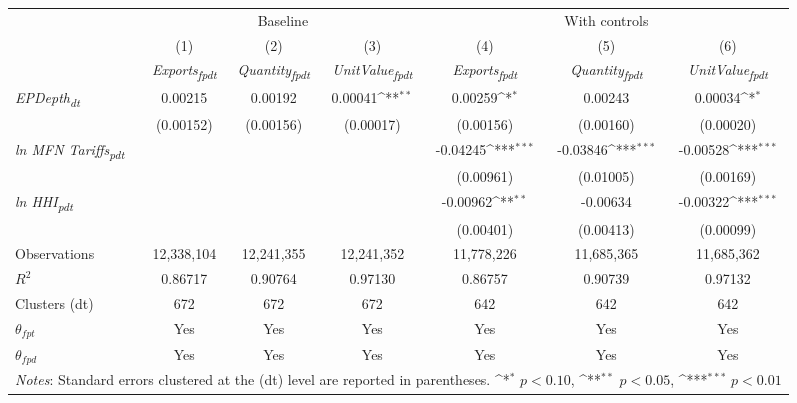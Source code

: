 {
\def\sym#1{\ifmmode^{#1}\else\(^{#1}\)\fi}
\begin{tabular}{l*{6}{c}}
\toprule
&\multicolumn{3}{c}{Baseline}&\multicolumn{3}{c}{With controls}\\\cmidrule(lr){2-4}\cmidrule(lr){5-7}
&(1)&(2)&(3)&(4)&(5)&(6)\\
&\textit{Exports\textsubscript{fpdt}}&\textit{Quantity\textsubscript{fpdt}}&\textit{UnitValue\textsubscript{fpdt}}&\textit{Exports\textsubscript{fpdt}}&\textit{Quantity\textsubscript{fpdt}}&\textit{UnitValue\textsubscript{fpdt}}\\
\midrule
\textit{EPDepth\textsubscript{dt}} & 0.00215 & 0.00192 & 0.00041\sym{**} & 0.00259\sym{*} & 0.00243 & 0.00034\sym{*}\\
 & (0.00152) & (0.00156) & (0.00017) & (0.00156) & (0.00160) & (0.00020)\\
\addlinespace
\textit{ln MFN Tariffs\textsubscript{pdt}} &  &  &  & -0.04245\sym{***} & -0.03846\sym{***} & -0.00528\sym{***}\\
 &  &  &  & (0.00961) & (0.01005) & (0.00169)\\
\addlinespace
\textit{ln HHI\textsubscript{pdt}} &  &  &  & -0.00962\sym{**} & -0.00634 & -0.00322\sym{***}\\
 &  &  &  & (0.00401) & (0.00413) & (0.00099)\\
\midrule
Observations & 12,338,104 & 12,241,355 & 12,241,352 & 11,778,226 & 11,685,365 & 11,685,362\\
$R^{2}$ & 0.86717 & 0.90764 & 0.97130 & 0.86757 & 0.90739 & 0.97132\\
Clusters (dt) & 672 & 672 & 672 & 642 & 642 & 642\\
$\theta_{fpt}$ & Yes & Yes & Yes & Yes & Yes & Yes\\
$\theta_{fpd}$ & Yes & Yes & Yes & Yes & Yes & Yes\\
\bottomrule
\multicolumn{7}{l}{\footnotesize \textit{Notes}: Standard errors clustered at the (dt) level are reported in parentheses. \sym{*} \(p<0.10\), \sym{**} \(p<0.05\), \sym{***} \(p<0.01\)}\\
\end{tabular}
}
